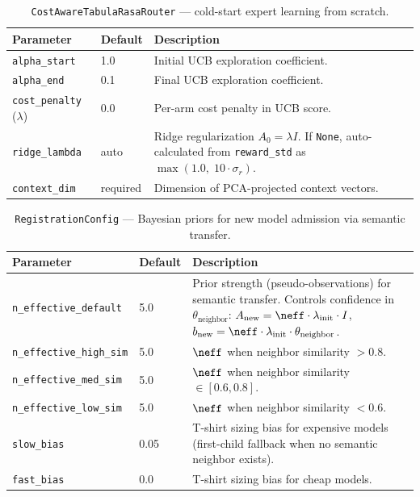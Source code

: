 
\begin{table}[h]
\centering
\caption{\texttt{CostAwareTabulaRasaRouter} --- cold-start expert learning from scratch.}
\label{tab:tabula_library}
\small
\begin{tabular}{@{}llp{6.8cm}@{}}
\toprule
\textbf{Parameter} & \textbf{Default} & \textbf{Description} \\
\midrule
\texttt{alpha\_start} & 1.0 & Initial UCB exploration coefficient. \\
\texttt{alpha\_end} & 0.1 & Final UCB exploration coefficient. \\
\texttt{cost\_penalty} ($\lambda$) & 0.0 & Per-arm cost penalty in UCB score. \\
\texttt{ridge\_lambda} & auto & Ridge regularization $A_0 = \lambda I$. If \texttt{None}, auto-calculated from \texttt{reward\_std} as $\max(1.0,\; 10 \cdot \sigma_r)$. \\
\texttt{context\_dim} & required & Dimension of PCA-projected context vectors. \\
\bottomrule
\end{tabular}
\end{table}


\begin{table}[h]
\centering
\caption{\texttt{RegistrationConfig} --- Bayesian priors for new model admission via semantic transfer.}
\label{tab:registration_library}
\small
\begin{tabular}{@{}llp{6.5cm}@{}}
\toprule
\textbf{Parameter} & \textbf{Default} & \textbf{Description} \\
\midrule
\texttt{n\_effective\_default} & 5.0 & Prior strength (pseudo-observations) for semantic transfer. Controls confidence in $\theta_{\text{neighbor}}$: $A_{\text{new}} = \neff \cdot \lambda_{\text{init}} \cdot I$,\; $b_{\text{new}} = \neff \cdot \lambda_{\text{init}} \cdot \theta_{\text{neighbor}}$. \\
\texttt{n\_effective\_high\_sim} & 5.0 & $\neff$ when neighbor similarity $> 0.8$. \\
\texttt{n\_effective\_med\_sim} & 5.0 & $\neff$ when neighbor similarity $\in [0.6, 0.8]$. \\
\texttt{n\_effective\_low\_sim} & 5.0 & $\neff$ when neighbor similarity $< 0.6$. \\
\texttt{slow\_bias} & 0.05 & T-shirt sizing bias for expensive models (first-child fallback when no semantic neighbor exists). \\
\texttt{fast\_bias} & 0.0 & T-shirt sizing bias for cheap models. \\
\bottomrule
\end{tabular}
\end{table}

